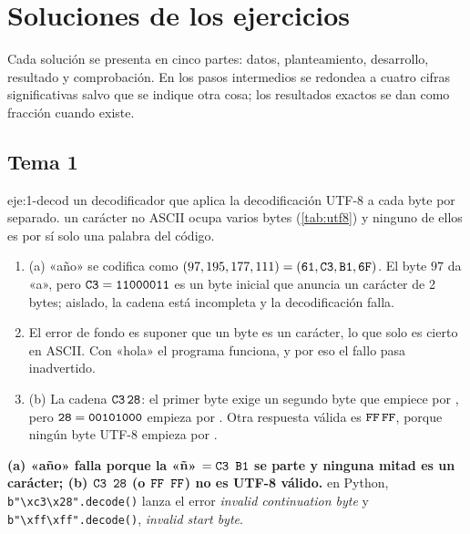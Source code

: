 \chapter{Soluciones de los ejercicios}
\label{ap:soluciones}

Cada solución se presenta en cinco partes: datos, planteamiento, desarrollo, resultado y comprobación. En los pasos intermedios se redondea a cuatro cifras significativas salvo que se indique otra cosa; los resultados exactos se dan como fracción cuando existe.

\section{Tema 1}

\begin{solucion}{eje:1-decod}
\datos un decodificador que aplica la decodificación UTF-8 a cada byte por separado.
\planteamiento un carácter no ASCII ocupa varios bytes (\cref{tab:utf8}) y ninguno de ellos es por sí solo una palabra del código.
\pasos
\begin{enumerate}[label=\arabic*.]
  \item (a) «año» se codifica como $(97,195,177,111)=(\texttt{61},\texttt{C3},\texttt{B1},\texttt{6F})$. El byte $97$ da «a», pero $\texttt{C3}=\texttt{11000011}$ es un byte inicial que anuncia un carácter de 2 bytes; aislado, la cadena está incompleta y la decodificación falla.
  \item El error de fondo es suponer que un byte es un carácter, lo que solo es cierto en ASCII. Con «hola» el programa funciona, y por eso el fallo pasa inadvertido.
  \item (b) La cadena $\texttt{C3}\,\texttt{28}$: el primer byte exige un segundo byte que empiece por , pero $\texttt{28}=\texttt{00101000}$ empieza por . Otra respuesta válida es $\texttt{FF}\,\texttt{FF}$, porque ningún byte UTF-8 empieza por .
\end{enumerate}
\resultado \textbf{(a) «año» falla porque la «ñ» $=\texttt{C3 B1}$ se parte y ninguna mitad es un carácter; (b) $\texttt{C3 28}$ (o $\texttt{FF FF}$) no es UTF-8 válido.}
\comprobacion en Python, \texttt{b"\textbackslash xc3\textbackslash x28".decode()} lanza el error \emph{invalid continuation byte} y \texttt{b"\textbackslash xff\textbackslash xff".decode()}, \emph{invalid start byte}.
\end{solucion}

